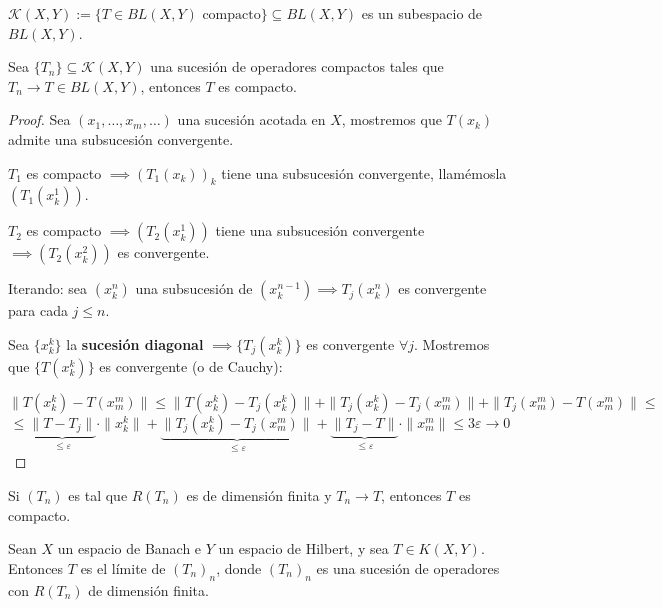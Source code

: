\begin{observacion}
    $\mathcal{K}(X, Y) := \{ T \in BL(X, Y) \text{ compacto} \} \subseteq BL(X, Y)$ es un subespacio de $BL(X, Y)$. \\
\end{observacion}


\begin{teo}
    Sea $\{T_n\} \subseteq \mathcal{K}(X, Y)$ una sucesión de operadores compactos tales que \mbox{$T_n \to T\in BL(X, Y)$}, entonces $T$ es compacto.
\begin{proof}
    Sea $(x_1, \dots, x_m, \dots)$ una sucesión acotada en $X$, mostremos que $T(x_k)$ admite una subsucesión convergente.

    $T_1$ es compacto $\implies (T_1(x_k))_k$ tiene una subsucesión convergente, llamémosla $(T_1(x_k^1))$.

    $T_2$ es compacto $\implies (T_2(x_k^1))$ tiene una subsucesión convergente $\implies (T_2(x_k^2))$ es convergente.

    Iterando: sea $(x_k^n)$ una subsucesión de $(x_k^{n-1}) \implies T_j(x_k^n)$ es convergente para cada $j \le n$.

    Sea $\{x_k^k\}$ la \textbf{sucesión diagonal} $\implies \{T_j(x_k^k)\}$ es convergente $\forall j$. Mostremos que $\{T(x_k^k)\}$ es convergente (o de Cauchy):

    \[ \|T(x_k^k) - T(x_m^m)\| \le \|T(x_k^k) - T_j(x_k^k)\| + \|T_j(x_k^k) - T_j(x_m^m)\| + \|T_j(x_m^m) - T(x_m^m)\| \le \]
    \[ \le \underbrace{\|T - T_j\|}_{\le \varepsilon} \cdot \|x_k^k\| + \underbrace{\|T_j(x_k^k) - T_j(x_m^m)\|}_{\le \varepsilon} + \underbrace{\|T_j - T\|}_{\le \varepsilon} \cdot \|x_m^m\| \le 3\varepsilon \to 0 \]
\end{proof}
\end{teo}

\begin{observacion}
    Si $(T_n)$ es tal que $R(T_n)$ es de dimensión finita y $T_n \to T$, entonces $T$ es compacto.
\end{observacion}



\begin{prop}
    Sean $X$ un espacio de Banach e $Y$ un espacio de Hilbert, y sea $T \in K(X, Y)$. Entonces $T$ es el límite de $(T_n)_n$, donde $(T_n)_n$ es una sucesión de operadores con $R(T_n)$ de dimensión finita.
\end{prop}

